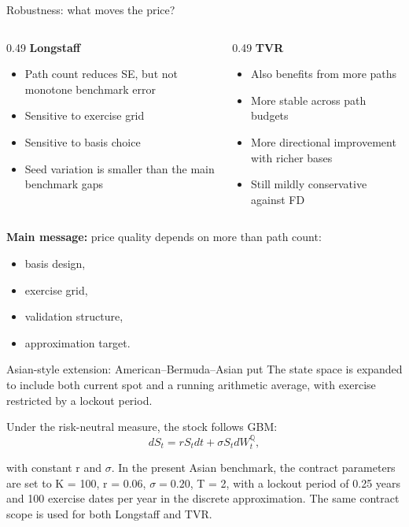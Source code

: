 \documentclass[
  11pt,
  ignorenonframetext,
  aspectratio=169,
]{beamer}
\providecommand{\tightlist}{%
  \setlength{\itemsep}{0pt}\setlength{\parskip}{0pt}}
\begin{document}
\begin{frame}{Robustness: what moves the price?}
\label{robustness-what-moves-the-price}
\begin{columns}[T]
\begin{column}{0.49\linewidth}
\textbf{Longstaff}

\begin{itemize}
\tightlist
\item
  Path count reduces SE, but not monotone benchmark error
\item
  Sensitive to exercise grid
\item
  Sensitive to basis choice
\item
  Seed variation is smaller than the main benchmark gaps
\end{itemize}
\end{column}

\begin{column}{0.49\linewidth}
\textbf{TVR}

\begin{itemize}
\tightlist
\item
  Also benefits from more paths
\item
  More stable across path budgets
\item
  More directional improvement with richer bases
\item
  Still mildly conservative against FD
\end{itemize}
\end{column}
\end{columns}

\textbf{Main message:} price quality depends on more than path count:

\begin{itemize}
\tightlist
\item
  basis design,
\item
  exercise grid,
\item
  validation structure,
\item
  approximation target.
\end{itemize}
\end{frame}

\begin{frame}{Asian-style extension: American--Bermuda--Asian put}
\label{asian-style-extension-americanbermudaasian-put}
The state space is expanded to include both current spot and a running
arithmetic average, with exercise restricted by a lockout period.

Under the risk-neutral measure, the stock follows GBM: \[
dS_t = r S_t dt + \sigma S_t dW_t^{\mathbb Q},
\]

with constant r and \(\sigma\). In the present Asian benchmark, the
contract parameters are set to K = 100, r = 0.06, \(\sigma = 0.20\), T =
2, with a lockout period of 0.25 years and 100 exercise dates per year
in the discrete approximation. The same contract scope is used for both
Longstaff and TVR.
\end{frame}
\end{document}
